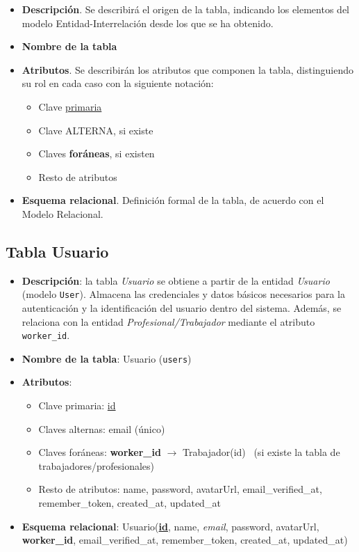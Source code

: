 \begin{itemize}
    \item \textbf{Descripción}. Se describirá el origen de la tabla, indicando los elementos del modelo Entidad-Interrelación desde los que se ha obtenido.
    \item \textbf{Nombre de la tabla}
    \item \textbf{Atributos}. Se describirán los atributos que componen la tabla, distinguiendo su rol en cada caso con la siguiente notación:
        \begin{itemize}
            \item Clave \underline{primaria}
            \item Clave ALTERNA, si existe
            \item Claves \textbf{foráneas}, si existen
            \item Resto de atributos
        \end{itemize}
    \item \textbf{Esquema relacional}. Definición formal de la tabla, de acuerdo con el Modelo Relacional.
\end{itemize}

\subsection{Tabla Usuario}
\begin{itemize}
    \item \textbf{Descripción}: la tabla \textit{Usuario} se obtiene a partir de la entidad \textit{Usuario}
    (modelo \texttt{User}). Almacena las credenciales y datos básicos necesarios para la autenticación y
    la identificación del usuario dentro del sistema. Además, se relaciona con la entidad \textit{Profesional/Trabajador}
    mediante el atributo \texttt{worker\_id}.

    \item \textbf{Nombre de la tabla}: Usuario (\texttt{users})

    \item \textbf{Atributos}:
    \begin{itemize}
        \item Clave primaria: \underline{id}
        \item Claves alternas: email (único)
        \item Claves foráneas: \textbf{worker\_id} $\rightarrow$ Trabajador(id) \ (si existe la tabla de trabajadores/profesionales)
        \item Resto de atributos: name, password, avatarUrl, email\_verified\_at, remember\_token, created\_at, updated\_at
    \end{itemize}

    \item \textbf{Esquema relacional}:
    Usuario(\textbf{\underline{id}}, name, \textit{email}, password, avatarUrl, \textbf{worker\_id}, email\_verified\_at, remember\_token, created\_at, updated\_at)
\end{itemize}


